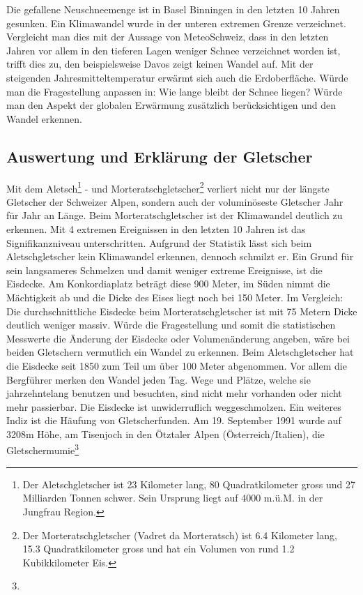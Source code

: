 \begin{refsection}
Die gefallene Neuschneemenge ist in Basel Binningen in den letzten 10 Jahren gesunken. Ein Klimawandel wurde in der unteren extremen Grenze verzeichnet. Vergleicht man dies mit der Aussage von MeteoSchweiz, dass in den letzten Jahren vor allem in den tieferen Lagen weniger Schnee verzeichnet worden ist, trifft dies zu, den beispielsweise Davos zeigt keinen Wandel auf. Mit der steigenden Jahresmitteltemperatur erwärmt sich auch die Erdoberfläche. Würde man die Fragestellung anpassen in: Wie lange bleibt der Schnee liegen? Würde man den Aspekt der globalen Erwärmung zusätzlich berücksichtigen und den Wandel erkennen.


\subsection{Auswertung und Erklärung der Gletscher}
Mit dem Aletsch\footnote{%
Der Aletschgletscher ist 23 Kilometer lang, 80 Quadratkilometer gross und 27 Milliarden Tonnen schwer. Sein Ursprung liegt auf 4000 m.ü.M. in der Jungfrau Region.}
- und Morteratschgletscher\footnote{%
Der Morteratschgletscher (Vadret da Morteratsch) ist 6.4 Kilometer lang, 15.3 Quadratkilometer gross und hat ein Volumen von rund 1.2 Kubikkilometer Eis.}
verliert nicht nur der längste Gletscher der Schweizer Alpen, sondern auch der voluminöseste Gletscher Jahr für Jahr an Länge. Beim Morteratschgletscher ist der Klimawandel deutlich zu erkennen. Mit 4 extremen Ereignissen in den letzten 10 Jahren ist das Signifikanzniveau unterschritten. Aufgrund der Statistik lässt sich beim Aletschgletscher kein Klimawandel erkennen, dennoch schmilzt er. Ein Grund für sein langsameres Schmelzen und damit weniger extreme Ereignisse, ist die Eisdecke. Am Konkordiaplatz beträgt diese 900 Meter, im Süden nimmt die Mächtigkeit ab und die Dicke des Eises liegt noch bei 150 Meter. Im Vergleich: Die durchschnittliche Eisdecke beim Morteratschgletscher ist mit 75 Metern Dicke deutlich weniger massiv. 
Würde die Fragestellung und somit die statistischen Messwerte die Änderung der Eisdecke oder Volumenänderung angeben, wäre bei beiden Gletschern vermutlich ein Wandel zu erkennen. Beim Aletschgletscher hat die Eisdecke seit 1850 zum Teil um über 100 Meter abgenommen. Vor allem die Bergführer merken den Wandel jeden Tag. Wege und Plätze, welche sie jahrzehntelang benutzen und besuchten, sind nicht mehr vorhanden oder nicht mehr passierbar. Die Eisdecke ist unwiderruflich weggeschmolzen.
Ein weiteres Indiz ist die Häufung von Gletscherfunden. Am 19. September 1991 wurde auf 3208m Höhe, am Tisenjoch in den Ötztaler Alpen (Österreich/Italien), die Gletschermumie\footnote{%
}
\end{refsection}
